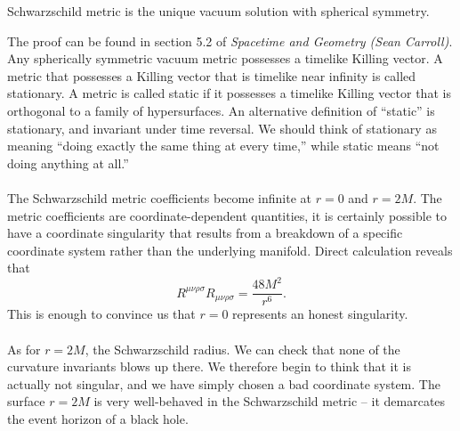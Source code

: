 \begin{newthem}
Schwarzschild metric is the unique vacuum solution with spherical symmetry.
\end{newthem}
\noindent
The proof can be found in section 5.2 of \emph{Spacetime and Geometry (Sean Carroll)}. 
Any spherically symmetric vacuum metric possesses a timelike Killing vector. A metric that possesses a Killing vector that is timelike near infinity is called stationary. A metric is called static if it possesses a timelike Killing vector that is orthogonal to a family of hypersurfaces. 
An alternative definition of ``static'' is stationary, and invariant under time reversal. We should think of stationary as meaning ``doing exactly the same thing at every time,'' while static means ``not doing anything at all.''
\\ \\
The Schwarzschild metric coefficients become infinite at $r = 0$ and $r = 2M$. 
The metric coefficients are coordinate-dependent quantities, it is certainly possible to have a coordinate singularity that results from a breakdown of a specific coordinate system rather than the underlying manifold. 
Direct calculation reveals that
\[R^{\mu\nu\rho\sigma}R_{\mu\nu\rho\sigma} = \frac{48M^2}{r^6}.\]
This is enough to convince us that $r = 0$ represents an honest singularity.
\\ \\
As for $r = 2M$, the Schwarzschild radius. We can check that none of the curvature invariants blows up there. We therefore begin to think that it is actually not singular, and we have simply chosen a bad coordinate system. The surface $r = 2M$ is very well-behaved in the Schwarzschild metric -- it demarcates the event horizon of a black hole.

